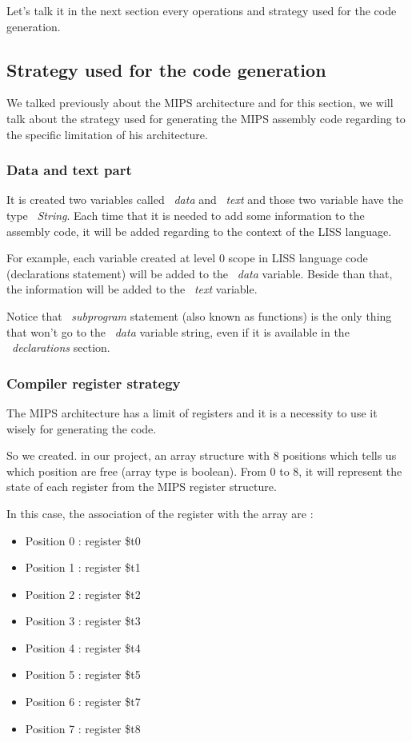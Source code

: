 \documentclass[
  oneside,
  11pt, a4paper,
  footinclude=true,
  headinclude=true,
  cleardoublepage=empty
]{scrbook}
\begin{document}
Let's talk it in the next section every operations and strategy used for the code generation.

\subsection{Strategy used for the code generation}


We talked previously about the MIPS architecture and for this section, we will talk about the strategy used for generating the MIPS assembly code regarding to the specific limitation of his architecture.

\subsubsection{Data and text part}

It is created two variables called ~\textit{data} and ~\textit{text} and those two variable have the type ~\textit{String}.
Each time that it is needed to add some information to the assembly code, it will be added regarding to the context of the LISS language.

For example, each variable created at level 0 scope in LISS language code (declarations statement) will be added to the ~\textit{data} variable. Beside than that, the information will be added to the ~\textit{text} variable.

Notice that ~\textit{subprogram} statement (also known as functions) is the only thing that won't go to the ~\textit{data} variable string, even if it is available in the ~\textit{declarations} section.


\subsubsection{Compiler register strategy}

The MIPS architecture has a limit of registers and it is a necessity to use it wisely for generating the code.

So we created. in our project, an array structure with 8 positions which tells us which position are free (array type is boolean).
From 0 to 8, it will represent the state of each register from the MIPS register structure.

In this case, the association of the register with the array are :

\begin{itemize}
\item Position 0 : register \$t0
\item Position 1 : register \$t1
\item Position 2 : register \$t2
\item Position 3 : register \$t3
\item Position 4 : register \$t4
\item Position 5 : register \$t5
\item Position 6 : register \$t7
\item Position 7 : register \$t8
\end{itemize}
\end{document}
